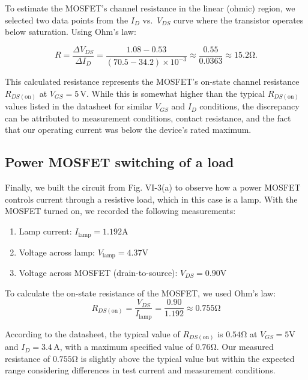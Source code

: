 \documentclass{article}
\begin{document}
\noindent To estimate the MOSFET's channel resistance in the linear (ohmic) 
region, we selected two data points from the $I_D$ vs.\ $V_{DS}$ curve
where the transistor operates below saturation. Using Ohm’s law:

\begin{equation}
    R = \frac{\Delta V_{DS}}{\Delta I_D} = \frac{1.08 - 0.53}{(70.5 - 34.2) \times 10^{-3}} \approx \frac{0.55}{0.0363} \approx 15.2\si{\ohm}.
\end{equation}

\noindent This calculated resistance represents the MOSFET’s on-state channel resistance
$R_{DS(\text{on})}$ at $V_{GS} = 5\,\si{\volt}$. While this is somewhat higher than the typical 
$R_{DS(\text{on})}$ values listed in the datasheet for similar $V_{GS}$ and $I_D$ conditions, the discrepancy can be attributed to measurement conditions, 
contact resistance, and the fact that our operating current was below the device’s rated maximum.

\subsection{Power MOSFET switching of a load}

Finally, we built the circuit from Fig. VI-3(a) to observe how a power
MOSFET controls current through a resistive load, which in this case is a lamp.
With the MOSFET turned on, we recorded the following measurements:

\begin{enumerate}
    \item Lamp current: $I_{\text{lamp}}=1.192\si{\ampere}$
    \item Voltage across lamp: $V_{\text{lamp}}=4.37\si{\volt}$
    \item Voltage across MOSFET (drain-to-source): $V_{DS}=0.90\si{\volt}$
\end{enumerate}

\noindent To calculate the on-state resistance of the MOSFET, we used Ohm's law:
\begin{equation}
    R_{DS(\text{on})}=\frac{V_{DS}}{I_{\text{lamp}}}=\frac{0.90}{1.192}\approx0.755\si{\ohm}
\end{equation}

\noindent According to the datasheet, the typical value of $R_{DS(\text{on})}$ is 
$0.54\si{\ohm}$ at $V_{GS} = 5\si{\volt}$ and $I_D = 3.4\,\si{\ampere}$, 
with a maximum specified value of $0.76\si{\ohm}$. Our measured resistance of 
$0.755\si{\ohm}$ is slightly above the typical value but within the 
expected range considering differences in test current and measurement conditions.\\
\end{document}
